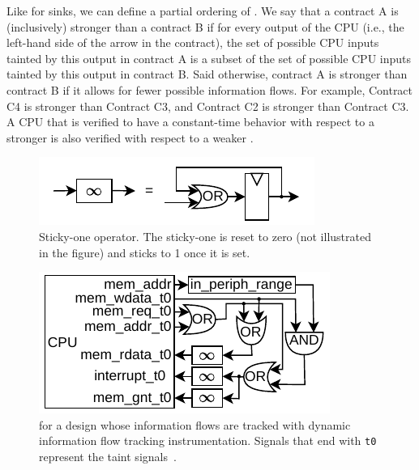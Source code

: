 
Like for sinks, we can define a partial ordering of \pics.
We say that a contract A is (inclusively) stronger than a contract B if for every output of the CPU (i.e., the left-hand side of the arrow in the contract), the set of possible CPU inputs tainted by this output in contract A is a subset of the set of possible CPU inputs tainted by this output in contract B.
Said otherwise, contract A is stronger than contract B if it allows for fewer possible information flows.
For example, Contract C4 is stronger than Contract C3, and Contract C2 is stronger than Contract C3.
A CPU that is verified to have a constant-time behavior with respect to a stronger \pic is also verified with respect to a weaker \pic.

\begin{figure}
    \begin{center}
    \includegraphics[width=.7\columnwidth]{figures/stickyone/stickyone.pdf}
    \end{center}
    \vspace*{-1.4em}
    \caption{Sticky-one operator. The sticky-one is reset to zero (not illustrated in the figure) and sticks to 1 once it is set.}
    \label{fig:stickyone}
\end{figure}


\begin{figure}[t]
    \begin{center}
    \includegraphics[width=.7\columnwidth]{figures/picinstrum_taints/picinstrum_taints.pdf}
    \end{center}
    \vspace*{-1em}
    \caption{\Pici for a design whose information flows are tracked with dynamic information flow tracking instrumentation. Signals that end with \texttt{t0} represent the taint signals~\cite{tiwari2009complete,solt2022cellift}.
    }
    \label{fig:pic_instrum_taints}
    \vspace*{-.4em}
\end{figure}


